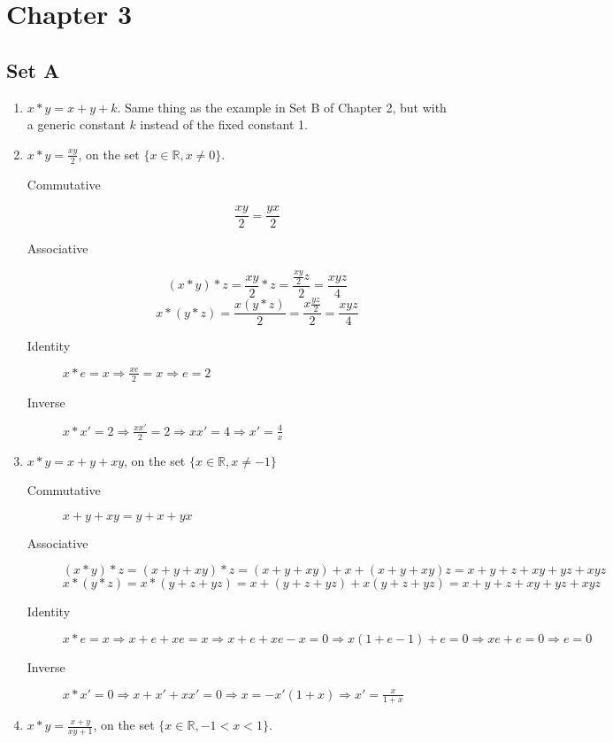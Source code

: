 \section{Chapter 3}

\subsection{Set A}

\begin{enumerate}
    \item $x * y = x + y + k$. Same thing as the example in Set B of Chapter 2, but with a generic constant $k$ instead of the fixed constant 1.
    \item $x * y = \frac{xy}{2}$, on the set $\{x \in \mathbb{R}, x \ne 0\}$.
    \begin{description}
        \item [Commutative] 
            $$\frac{xy}{2} = \frac{yx}{2}$$
        \item [Associative]
        $$(x * y) * z = \frac{xy}{2} * z = \frac{\frac{xy}{2}z}{2} = \frac{xyz}{4}$$
        $$x * (y * z) = \frac{x(y * z)}{2} = \frac{x\frac{yz}{2}}{2} = \frac{xyz}{4}$$
        \item [Identity] $x * e = x \Rightarrow \frac{xe}{2} = x \Rightarrow e = 2$
        \item [Inverse] $x * x' = 2 \Rightarrow \frac{xx'}{2} = 2 \Rightarrow xx' = 4 \Rightarrow x' = \frac{4}{x}$
    \end{description}
    \item $x * y = x + y + xy$, on the set $\{x \in \mathbb{R}, x \ne -1\}$
    \begin{description}
        \item [Commutative] $x + y + xy = y + x + yx$
        \item [Associative]
        $$(x * y) * z = (x + y + xy) * z = (x + y + xy) + x + (x + y + xy)z = x + y + z + xy + yz + xyz$$
        $$x * (y * z) = x * (y + z + yz) = x + (y + z + yz) + x(y + z + yz) = x + y + z + xy + yz + xyz$$
        \item [Identity] $x * e = x \Rightarrow x + e + xe = x \Rightarrow x + e + xe - x = 0 \Rightarrow x(1 + e - 1) + e = 0 \Rightarrow xe + e = 0 \Rightarrow e = 0$
        \item [Inverse] $x * x' = 0 \Rightarrow x + x'+ xx' = 0 \Rightarrow x = -x'(1 + x) \Rightarrow x' = \frac{x}{1+x}$
    \end{description}
    \item $x * y = \frac{x + y}{xy + 1}$, on the set $\{x \in \mathbb{R}, -1 < x < 1\}$.

\end{enumerate}
